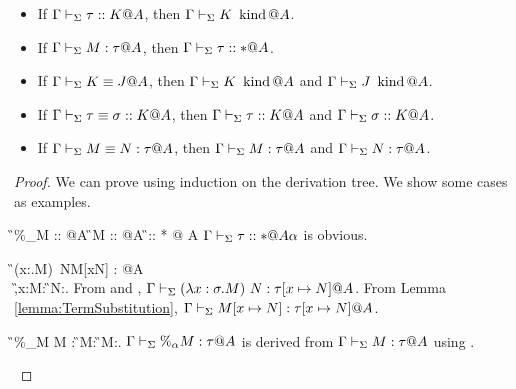 \begin{lemma}[Agreement]
    \label{lemma:Agreement}
    \begin{itemize}
        \item If \(\Gamma\vdash_\Sigma \tau::K@A\), then \(\G\V K\iskind@A \).
        \item If \(\G\V M:\tau@A\), then \(\Gamma\vdash_\Sigma \tau::*@A\).
        \item If \(\Gamma\vdash_\Sigma K\equiv J@A\), then \(\Gamma\vdash_\Sigma K \operatorname{\ kind} @A\) and \(\Gamma\vdash_\Sigma J \operatorname{\ kind} @A\).
        \item If \(\Gamma\vdash_\Sigma \tau\equiv \sigma :: K@A\), then \(\Gamma\vdash_\Sigma \tau::K@A\) and \(\Gamma\vdash_\Sigma \sigma::K@A\).
        \item If \(\G\V M\E N : \tau@A\), then \(\G\V M:\tau@A\) and \(\G\V N:\tau@A\).
    \end{itemize}
\end{lemma}
\begin{proof}

    We can prove using induction on the derivation tree.  We show some cases as
    examples.

    \begin{rneqncase}{\TCsp{}}{
            \G\V \%_\alpha M :: \tau @A\alpha {} \G\V M :: \tau @A  \G \V \tau :: * @ A\alpha
            }
            \( \Gamma \vdash_\Sigma \tau :: * @ A\alpha \) is obvious.
    \end{rneqncase}
    \begin{rneqncase}{\QBeta{}}{
            \G\V(\lambda x:\sigma.M)\ N\E M[x\mapsto N] : \tau[x \mapsto N]@A \\
            \G,x:\sigma@A\V M:\tau@A {} \G\V N:\sigma@A.
            }
            From \TAbs{} and \TApp, \( \Gamma\vdash_\Sigma(\lambda x:\sigma.M)\ N : \tau[x \mapsto N]@A \).
            From Lemma \ref{lemma:TermSubstitution}, \( \Gamma\vdash_\Sigma M[x\mapsto N] : \tau[x \mapsto N]@A \).
    \end{rneqncase}
    \begin{rneqncase}{\QPercent}{
            \G\V\%_\alpha M \E M :  
            \G\V M: 
            \G\V M:\tau@A.
        }
        \( \G\V \%_\alpha M:\tau@A \) is derived from \( \G\V M:\tau@A \) using \TCsp.
    \end{rneqncase}

\end{proof}

